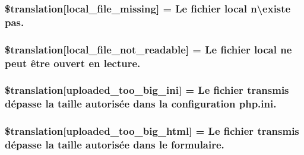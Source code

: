 \subsubsection[{\$translation}]{\setlength{\rightskip}{0pt plus 5cm}\$translation\mbox{[}\textquotesingle{}local\+\_\+file\+\_\+missing\textquotesingle{}\mbox{]} = \textquotesingle{}Le fichier local n\textbackslash{}\textquotesingle{}existe pas.\textquotesingle{}}\label{class_8upload_8fr___f_r_8php_a6ec3d3a47ab70d77e7aa593e82ead10e}
\hypertarget{class_8upload_8fr___f_r_8php_a60104befef9b241f3a7a6a755618a4b3}{}
\subsubsection[{\$translation}]{\setlength{\rightskip}{0pt plus 5cm}\$translation\mbox{[}\textquotesingle{}local\+\_\+file\+\_\+not\+\_\+readable\textquotesingle{}\mbox{]} = \textquotesingle{}Le fichier local ne peut être ouvert en lecture.\textquotesingle{}}\label{class_8upload_8fr___f_r_8php_a60104befef9b241f3a7a6a755618a4b3}
\hypertarget{class_8upload_8fr___f_r_8php_a6a08dcd0d3651fdd098568f6b2f0a42c}{}
\subsubsection[{\$translation}]{\setlength{\rightskip}{0pt plus 5cm}\$translation\mbox{[}\textquotesingle{}uploaded\+\_\+too\+\_\+big\+\_\+ini\textquotesingle{}\mbox{]} = \textquotesingle{}Le fichier transmis dépasse la taille autorisée dans la configuration php.\+ini.\textquotesingle{}}\label{class_8upload_8fr___f_r_8php_a6a08dcd0d3651fdd098568f6b2f0a42c}
\hypertarget{class_8upload_8fr___f_r_8php_a623d5b8b92169f57d7e43458aa911cbb}{}
\subsubsection[{\$translation}]{\setlength{\rightskip}{0pt plus 5cm}\$translation\mbox{[}\textquotesingle{}uploaded\+\_\+too\+\_\+big\+\_\+html\textquotesingle{}\mbox{]} = \textquotesingle{}Le fichier transmis dépasse la taille autorisée dans le formulaire.\textquotesingle{}}\label{class_8upload_8fr___f_r_8php_a623d5b8b92169f57d7e43458aa911cbb}
\hypertarget{class_8upload_8fr___f_r_8php_a967c17da21b0a2d3bd65cca3a9ca0ea8}{}
